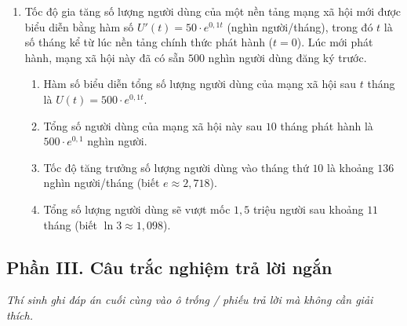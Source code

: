\documentclass[12pt]{article}
\begin{document}
\begin{enumerate}[label=\textbf{Câu \arabic*.}, start=1]
		\item Tốc độ gia tăng số lượng người dùng của một nền tảng mạng xã hội mới được biểu diễn bằng hàm số $U'(t) = 50 \cdot e^{0,1t}$ (nghìn người/tháng), trong đó $t$ là số tháng kể từ lúc nền tảng chính thức phát hành ($t=0$). Lúc mới phát hành, mạng xã hội này đã có sẵn $500$ nghìn người dùng đăng ký trước.
		\begin{enumerate}[label=\alph*)]
			\item Hàm số biểu diễn tổng số lượng người dùng của mạng xã hội sau $t$ tháng là $U(t) = 500 \cdot e^{0,1t}$.
			\item Tổng số người dùng của mạng xã hội này sau $10$ tháng phát hành là $500 \cdot e^{0,1}$ nghìn người.
			\item Tốc độ tăng trưởng số lượng người dùng vào tháng thứ $10$ là khoảng $136$ nghìn người/tháng (biết $e \approx 2,718$).
			\item Tổng số lượng người dùng sẽ vượt mốc $1,5$ triệu người sau khoảng $11$ tháng (biết $\ln 3 \approx 1,098$).
		\end{enumerate}
	\end{enumerate}
	
	\subsection{Phần III. Câu trắc nghiệm trả lời ngắn}
	\textit{Thí sinh ghi đáp án cuối cùng vào ô trống / phiếu trả lời mà không cần giải thích.}
	
\end{document}
